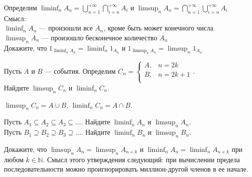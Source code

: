 \begin{problem}
Определим $\liminf_{n}
A_{n}=\bigcup_{n=1}^{+\infty}\bigcap_{i=n}^{+\infty}A_{i}$ и
$\limsup_{n}
A_{n}=\bigcap_{n=1}^{+\infty}\bigcup_{i=n}^{+\infty}A_{i}$ \\
Смысл: \\
$\liminf_{n} A_{n}$ --- произошли все $A_{n}$, кроме быть может
конечного числа \\
$\limsup_{n} A_{n}$ --- произошло бесконечное количество $A_{n}$ \\
Докажите, что $1_{\liminf_{n}A_{n}}=\liminf_{n}1_{A_{n}}$ и
$1_{\limsup_{n}A_{n}}=\limsup_{n}1_{A_{n}}$ 
\end{problem} 
\begin{solution} 

\end{solution}

\begin{problem}
Пусть $A$ и $B$ --- события. Определим $C_{n}=
\begin{cases}
  A, & n=2k \\
  B, & n=2k+1 \\
\end{cases}$. \\
Найдите $\limsup_{n}C_{n}$ и $\liminf_{n}C_{n}$.
\end{problem} 
\begin{solution} 
$\limsup_{n}C_{n}=A\cup B$, $\liminf_{n}C_{n}=A\cap B$. 
\end{solution}

\begin{problem}
Пусть $A_{1} \subseteq A_{2} \subseteq A_{3} \subseteq \ldots$.
Найдите $\liminf_{n}A_{n}$ и $\limsup_{n}A_{n}$. \\
Пусть $B_{1} \supseteq B_{2} \supseteq B_{3} \supseteq \ldots$.
Найдите $\liminf_{n}B_{n}$ и $\limsup_{n}B_{n}$. 

\end{problem} 
\begin{solution} 

\end{solution}

\begin{problem}
Докажите, что $\limsup_{n}A_{n}=\limsup_{n}A_{n+k}$ и
$\liminf_{n}A_{n}=\liminf_{n}A_{n+k}$ при любом $k\in\mathbb{N}$.
Смысл этого утверждения следующий: при вычислении предела
последовательности можно проигнорировать миллион-другой членов в
ее начале. 
\end{problem} 
\begin{solution} 

\end{solution}

